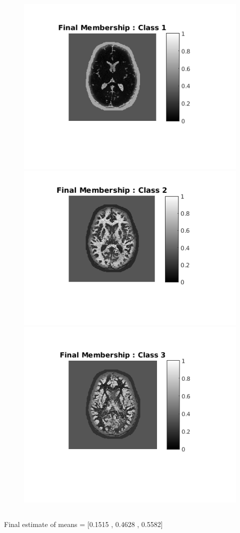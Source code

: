 \documentclass[11pt]{article}
\begin{document}
\begin{figure}[h]
\centering
\includegraphics[]{fin1}
\includegraphics[]{fin2}
\includegraphics[]{fin3}
\end{figure}


\subsection{}
Final estimate of means = [0.1515  ,  0.4628  ,  0.5582]
\end{document}
